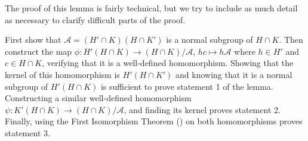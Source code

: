 The proof of this lemma is fairly technical, but we try to include as much detail as necessary to clarify difficult parts of the proof.

\begin{proofsketch}
    First show that $\mathcal{A} = (H' \cap K)(H \cap K')$ is a normal subgroup of $H \cap K$. Then construct the map $\phi: H'(H\cap K) \to (H\cap K)/\mathcal{A}$, $hc \mapsto h\mathcal{A}$ where $h \in H'$ and $c \in H \cap K$, verifying that it is a well-defined homomorphism. Showing that the kernel of this homomorphism is $H'(H \cap K')$ and knowing that it is a normal subgroup of $H'(H\cap K)$ is sufficient to prove statement 1 of the lemma. Constructing a similar well-defined homomorphism $\psi: K'(H\cap K) \to (H\cap K)/\mathcal{A}$, and finding its kernel proves statement 2. Finally, using the First Isomorphism Theorem () on both homomorphisms proves statement 3.
\end{proofsketch}
